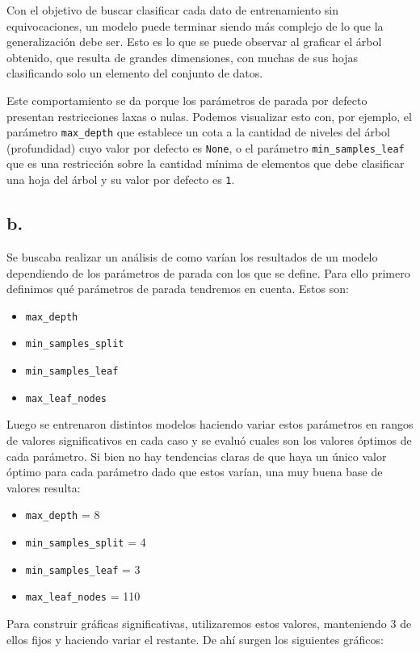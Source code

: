 \documentclass{article}
\begin{document}
Con el objetivo de buscar clasificar cada dato de entrenamiento sin equivocaciones, un modelo puede terminar siendo más complejo de lo que la generalización debe ser. Esto es lo que se puede observar al graficar el árbol obtenido, que resulta de grandes dimensiones, con muchas de sus hojas clasificando solo un elemento del conjunto de datos.

Este comportamiento se da porque los parámetros de parada por defecto presentan restricciones laxas o nulas. Podemos visualizar esto con, por ejemplo, el parámetro \verb|max_depth| que establece un cota a la cantidad de niveles del árbol (profundidad) cuyo valor por defecto es \verb|None|, o el parámetro \verb|min_samples_leaf| que es una restricción sobre la cantidad mínima de elementos que debe clasificar una hoja del árbol y su valor por defecto es \verb|1|.

\subsection*{b.}

Se buscaba realizar un análisis de como varían los resultados de un modelo dependiendo de los parámetros de parada con los que se define. Para ello primero definimos qué parámetros de parada tendremos en cuenta. Estos son:

\begin{itemize}
	\item \verb|max_depth|
	\item \verb|min_samples_split|
	\item \verb|min_samples_leaf|
	\item \verb|max_leaf_nodes|
\end{itemize}

Luego se entrenaron distintos modelos haciendo variar estos parámetros en rangos de valores significativos en cada caso y se evaluó cuales son los valores óptimos de cada parámetro. Si bien no hay tendencias claras de que haya un único valor óptimo para cada parámetro dado que estos varían, una muy buena base de valores resulta:
\begin{itemize}
	\item \verb|max_depth| = 8
	\item \verb|min_samples_split| = 4
	\item \verb|min_samples_leaf| = 3
	\item \verb|max_leaf_nodes| = 110
\end{itemize}

Para construir gráficas significativas, utilizaremos estos valores, manteniendo 3 de ellos fijos y haciendo variar el restante. De ahí surgen los siguientes gráficos:
\end{document}
